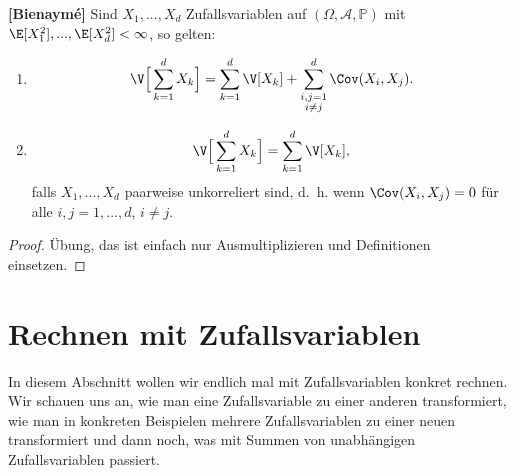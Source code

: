 \begin{satz}\label{bien}
 \textbf{[Bienaymé]}
 Sind $X_1,...,X_d$ Zufallsvariablen auf $(\Omega, \mathcal A, \mathbb P)$ mit $\E[X_1^2],...,\E[X_d^2] < \infty$, so gelten:
	\begin{enumerate}[label=(\roman*)]
		\item
		\[ \V\Big[\sum\limits_{k=1}^{d} X_k\Big] = \sum\limits_{k=1}^{d} \V[X_k] + \sum\limits_{\substack{i,j=1\\i \neq j}}^{d} \Cov(X_i,X_j).  \]
		\item \[ \V\Big[\sum\limits_{k=1}^{d} X_k\Big]= \sum\limits_{k=1}^{d} \V[X_k], \] falls $X_1,...,X_d$ paarweise unkorreliert sind, \mbox{d. h.} wenn $\Cov(X_i,X_j) = 0$ f\"ur alle $ i,j = 1,...,d$, $i\neq j$. 
	\end{enumerate}
\end{satz}

\begin{proof}
	Übung, das ist einfach nur Ausmultiplizieren und Definitionen einsetzen.
\end{proof}

\section{Rechnen mit Zufallsvariablen}
\marginpar{\textcolor{red}{Vorlesung 22}}
In diesem Abschnitt wollen wir endlich mal mit Zufallsvariablen konkret rechnen. Wir schauen uns an, wie man eine Zufallsvariable zu einer anderen transformiert, wie man in konkreten Beispielen mehrere Zufallsvariablen zu einer neuen transformiert und dann noch, was mit Summen von unabh\"angigen Zufallsvariablen passiert.



